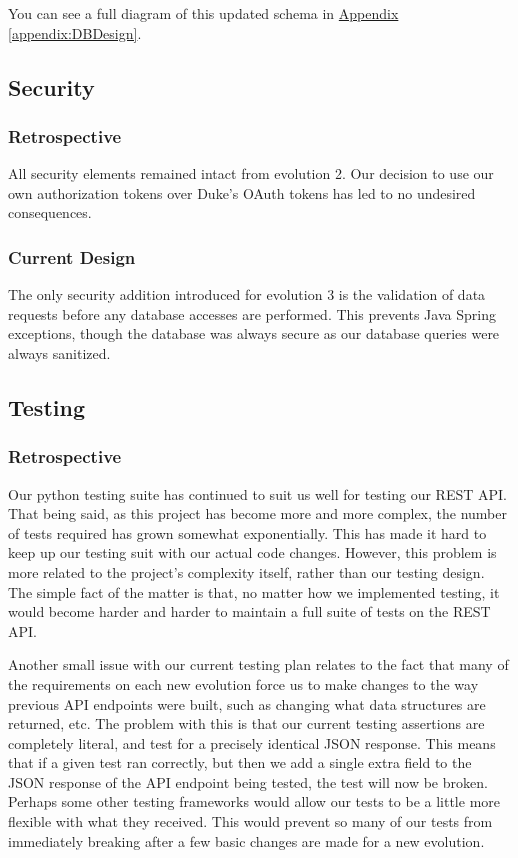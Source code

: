 \documentclass[12pt]{article}
\begin{document}
You can see a full diagram of this updated schema in  \hyperref[appendix:DBDesign]{Appendix \ref{appendix:DBDesign}}. 

\subsection{Security}
\subsubsection{Retrospective}
All security elements remained intact from evolution 2. Our decision to use our own authorization tokens over Duke's OAuth tokens has led to no undesired consequences. 

\subsubsection{Current Design}

The only security addition introduced for evolution 3 is the validation of data requests before any database accesses are performed. This prevents Java Spring exceptions, though the database was always secure as our database queries were always sanitized. 


\subsection{Testing}
\subsubsection{Retrospective}
Our python testing suite has continued to suit us well for testing our REST API. That being said, as this project has become more and more complex, the number of tests required has grown somewhat exponentially. This has made it hard to keep up our testing suit with our actual code changes. However, this problem is more related to the project's complexity itself, rather than our testing design. The simple fact of the matter is that, no matter how we implemented testing, it would become harder and harder to maintain a full suite of tests on the REST API. 

Another small issue with our current testing plan relates to the fact that many of the requirements on each new evolution force us to make changes to the way previous API endpoints were built, such as changing what data structures are returned, etc. The problem with this is that our current testing assertions are completely literal, and test for a precisely identical JSON response. This means that if a given test ran correctly, but then we add a single extra field to the JSON response of the API endpoint being tested, the test will now be broken. Perhaps some other testing frameworks would allow our tests to be a little more flexible with what they received. This would prevent so many of our tests from immediately breaking after a few basic changes are made for a new evolution. 
\end{document}
